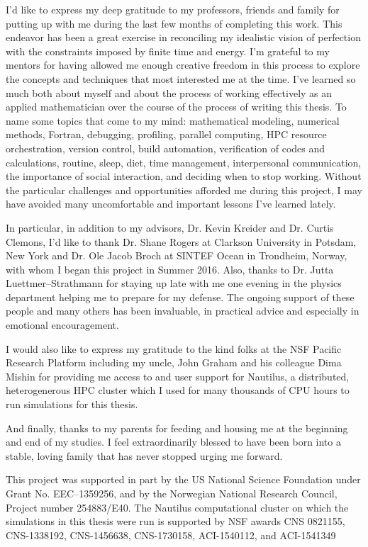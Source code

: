 \begin{acknowledgements}
I'd like to express my deep gratitude to my professors, friends and family for putting up with me during the last few months of completing this work.
This endeavor has been a great exercise in reconciling my idealistic vision of perfection with the constraints imposed by finite time and energy.
I'm grateful to my mentors for having allowed me enough creative freedom in this process to explore the concepts and techniques that most interested me at the time.
I've learned so much both about myself and about the process of working effectively as an applied mathematician over the course of the process of writing this thesis.
To name some topics that come to my mind: mathematical modeling, numerical methods, Fortran, debugging, profiling, parallel computing, HPC resource orchestration, version control, build automation, verification of codes and calculations, routine, sleep, diet, time management, interpersonal communication, the importance of social interaction, and deciding when to stop working.
Without the particular challenges and opportunities afforded me during this project, I may have avoided many uncomfortable and important lessons I've learned lately.

In particular, in addition to my advisors, Dr. Kevin Kreider and Dr. Curtis Clemons, I'd like to thank Dr. Shane Rogers at Clarkson University in Potsdam, New York and Dr. Ole Jacob Broch at SINTEF Ocean in Trondheim, Norway, with whom I began this project in Summer 2016.
Also, thanks to Dr. Jutta Luettmer--Strathmann for staying up late with me one evening in the physics department helping me to prepare for my defense.
The ongoing support of these people and many others has been invaluable, in practical advice and especially in emotional encouragement.

I would also like to express my gratitude to the kind folks at the NSF Pacific Research Platform including my uncle, John Graham and his colleague Dima Mishin for providing me access to and user support for Nautilus, a distributed, heterogenerous HPC cluster which I used for many thousands of CPU hours to run simulations for this thesis.

And finally, thanks to my parents for feeding and housing me at the beginning and end of my studies.
I feel extraordinarily blessed to have been born into a stable, loving family that has never stopped urging me forward.

\vfill

This project was supported in part by the US National Science
Foundation under Grant No. EEC--1359256, and by the Norwegian National Research
Council, Project number 254883/E40.
The Nautilus computational cluster on which the simulations in this thesis were run is supported by NSF awards 
CNS 0821155, CNS-1338192, CNS-1456638, CNS-1730158, 
ACI-1540112, and ACI-1541349

\end{acknowledgements}






